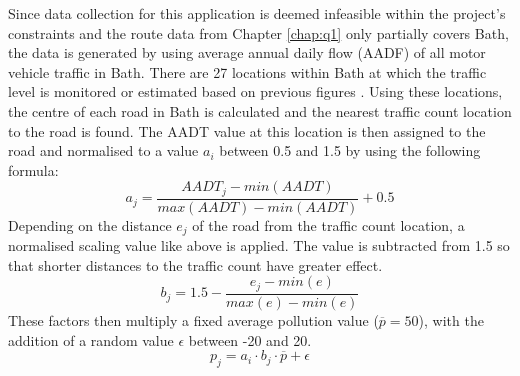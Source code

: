 \documentclass[11pt,twosided,a4paper]{report}
\begin{document}
Since data collection for this application is deemed infeasible within the project's constraints and the route data from Chapter \ref{chap:q1} only partially covers Bath, the data is generated by using average annual daily flow (AADF) of all motor vehicle traffic in Bath. There are 27 locations within Bath at which the traffic level is monitored or estimated based on previous figures \citep{dft2018traffic}. Using these locations, the centre of each road in Bath is calculated and the nearest traffic count location to the road is found. The AADT value at this location is then assigned to the road and normalised to a value $a_i$ between 0.5 and 1.5 by using the following formula:
\begin{equation}
a_j = \frac{AADT_j - min(AADT)}{max(AADT) - min(AADT)} + 0.5
\end{equation}
Depending on the distance $e_j$ of the road from the traffic count location, a normalised scaling value like above is applied. The value is subtracted from 1.5 so that shorter distances to the traffic count have greater effect.
\begin{equation}
b_j = 1.5 - \frac{e_j - min(e)}{max(e) - min(e)}
\end{equation}
These factors then multiply a fixed average pollution value ($\overline{p} = 50$), with the addition of a random value $\epsilon$ between -20 and 20.
\begin{equation}
p_j = a_i \cdot b_j \cdot \overline{p} + \epsilon
\end{equation}


%
%
\end{document}
